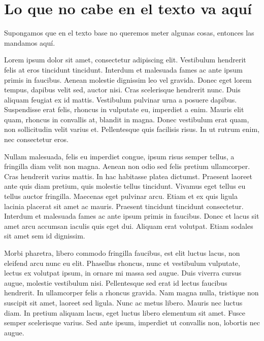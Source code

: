 
\chapter{Lo que no cabe en el texto va aquí}
\label{Apendice1}

Supongamos que en el texto base no queremos meter algunas cosas, entonces las mandamos aquí.

Lorem ipsum dolor sit amet, consectetur adipiscing elit. Vestibulum hendrerit felis at eros tincidunt tincidunt. Interdum et malesuada fames ac ante ipsum primis in faucibus. Aenean molestie dignissim leo vel gravida. Donec eget lorem tempus, dapibus velit sed, auctor nisi. Cras scelerisque hendrerit nunc. Duis aliquam feugiat ex id mattis. Vestibulum pulvinar urna a posuere dapibus. Suspendisse erat felis, rhoncus in vulputate eu, imperdiet a enim. Mauris elit quam, rhoncus in convallis at, blandit in magna. Donec vestibulum erat quam, non sollicitudin velit varius et. Pellentesque quis facilisis risus. In ut rutrum enim, nec consectetur eros.

Nullam malesuada, felis eu imperdiet congue, ipsum risus semper tellus, a fringilla diam velit non magna. Aenean non odio sed felis pretium ullamcorper. Cras hendrerit varius mattis. In hac habitasse platea dictumst. Praesent laoreet ante quis diam pretium, quis molestie tellus tincidunt. Vivamus eget tellus eu tellus auctor fringilla. Maecenas eget pulvinar arcu. Etiam et ex quis ligula lacinia placerat sit amet ac mauris. Praesent tincidunt tincidunt consectetur. Interdum et malesuada fames ac ante ipsum primis in faucibus. Donec et lacus sit amet arcu accumsan iaculis quis eget dui. Aliquam erat volutpat. Etiam sodales sit amet sem id dignissim.

Morbi pharetra, libero commodo fringilla faucibus, est elit luctus lacus, non eleifend arcu nunc eu elit. Phasellus rhoncus, nunc et vestibulum vulputate, lectus ex volutpat ipsum, in ornare mi massa sed augue. Duis viverra cursus augue, molestie vestibulum nisi. Pellentesque sed erat id lectus faucibus hendrerit. In ullamcorper felis a rhoncus gravida. Nam magna nulla, tristique non suscipit sit amet, laoreet sed ligula. Nunc ac metus libero. Mauris nec luctus diam. In pretium aliquam lacus, eget luctus libero elementum sit amet. Fusce semper scelerisque varius. Sed ante ipsum, imperdiet ut convallis non, lobortis nec augue.

